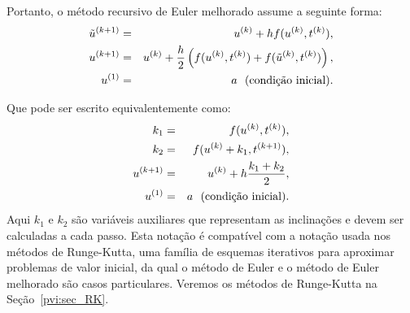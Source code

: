 Portanto, o método recursivo de Euler melhorado assume a seguinte forma:
\begin{eqnarray*}
\tilde{u}^{(k+1)}&=&u^{(k)}+hf(u^{(k)},t^{(k)}),\\
u^{(k+1)}&=&u^{(k)}+\frac{h}{2}\left(f(u^{(k)},t^{(k)})+f(\tilde{u}^{(k)},t^{(k)})\right),\\
u^{(1)}&=&a~~ \hbox{(condição inicial)}.
\end{eqnarray*}

Que pode ser escrito equivalentemente como:
\begin{eqnarray*}
k_1&=&f(u^{(k)},t^{(k)}),\\
k_2&=&f(u^{(k)}+k_1,t^{(k+1)}),\\
u^{(k+1)}&=&u^{(k)}+h\frac{k_1+k_2}{2},\\
u^{(1)}&=&a~~ \hbox{(condição inicial)}.
\end{eqnarray*}
Aqui $k_1$ e $k_2$ são variáveis auxiliares que representam as inclinações e devem ser calculadas a cada passo. Esta notação é compatível com a notação usada nos métodos de Runge-Kutta, uma família de esquemas iterativos para aproximar problemas de valor inicial, da qual o método de Euler e o método de Euler melhorado são casos particulares. Veremos os métodos de Runge-Kutta na Seção~\ref{pvi:sec_RK}.


